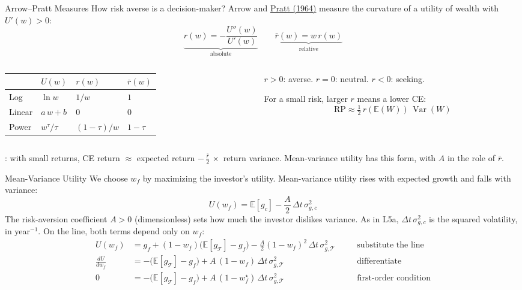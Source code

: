 \documentclass[aspectratio=169,11pt]{beamer}
\newcommand{\E}{\mathbb{E}}
\newcommand{\Var}{\operatorname{Var}}
\newcommand{\Tan}{\mathcal{T}}
\newcommand{\RP}{\mathrm{RP}}
\begin{document}
\begin{frame}{Arrow–Pratt Measures}
  How risk averse is a decision-maker? Arrow and
  \href{https://doi.org/10.2307/1913738}{Pratt (1964)} measure the curvature of
  a utility of wealth with $U'(w)>0$:
  \[
    \boxed{\underbrace{r(w)=-\frac{U''(w)}{U'(w)}}_{\text{absolute}}\qquad
    \underbrace{\bar r(w)=w\,r(w)}_{\text{relative}}}
  \]
  \begin{columns}[c]
    \begin{column}{0.42\textwidth}
      {\small
      \begin{tabular}{@{}llll@{}}
        \toprule
        & $U(w)$ & $r(w)$ & $\bar r(w)$\\
        \midrule
        Log & $\ln w$ & $1/w$ & $1$\\
        Linear & $a\,w+b$ & $0$ & $0$\\
        Power & $w^{\tau}/\tau$ & $(1-\tau)/w$ & $1-\tau$\\
        \bottomrule
      \end{tabular}}
    \end{column}
    \begin{column}{0.55\textwidth}
      $r>0$: averse. $r=0$: neutral. $r<0$: seeking.

      \vspace{0.5em}
      For a small risk, larger $r$ means a lower CE:
      \[
        \RP\approx\tfrac12\,r(\E(W))\,\Var(W)
      \]
    \end{column}
  \end{columns}

  \vspace{0.6em}
  : with small returns,
  CE return $\approx$ expected return $-\,\tfrac{\bar r}{2}\,{\times}$ return variance.
  Mean-variance utility has this form, with $A$ in the role of $\bar r$.
\end{frame}

\begin{frame}{Mean-Variance Utility}
  We choose $w_f$ by maximizing the investor's utility. Mean-variance utility
  rises with expected growth and falls with variance:
  \[
    \boxed{U(w_f)=\E[g_c]-\frac{A}{2}\,\Delta t\,\sigma^2_{g,c}}
  \]
  The risk-aversion coefficient $A>0$ (dimensionless) sets how much the investor
  dislikes variance. As in L5a, $\Delta t\,\sigma^2_{g,c}$ is the squared
  volatility, in year$^{-1}$. On the line, both terms depend only on $w_f$:
  \[
    \begin{aligned}
      U(w_f)&=g_f+(1-w_f)\bigl(\E[g_{\Tan}]-g_f\bigr)-\tfrac{A}{2}(1-w_f)^2\,\Delta t\,\sigma^2_{g,\Tan}
        &&\quad\text{substitute the line}\\
      \frac{dU}{dw_f}&=-\bigl(\E[g_{\Tan}]-g_f\bigr)+A\,(1-w_f)\,\Delta t\,\sigma^2_{g,\Tan}
        &&\quad\text{differentiate}\\
      0&=-\bigl(\E[g_{\Tan}]-g_f\bigr)+A\,(1-w_f^\star)\,\Delta t\,\sigma^2_{g,\Tan}
        &&\quad\text{first-order condition}
    \end{aligned}
  \]
\end{frame}
\end{document}
